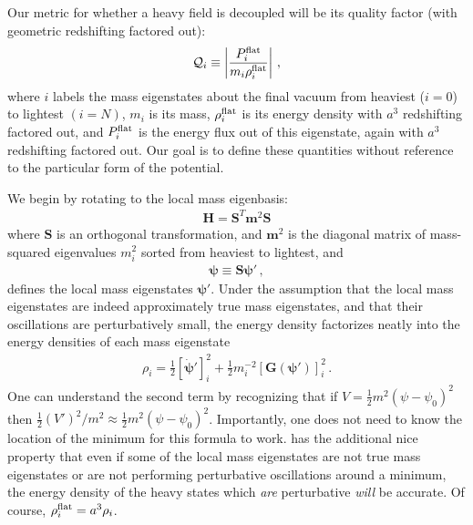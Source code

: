 \documentclass[11pt]{article}
\begin{document}
Our metric for whether a heavy field is decoupled will be its quality factor (with geometric redshifting factored out):
\begin{align}
    {\cal Q}_i\equiv \left|\frac{P_i^{\rm flat}}{m_i\rho_i^{\rm flat}}\right|\,,
\end{align}
where $i$ labels the mass eigenstates about the final vacuum from heaviest ($i = 0$) to lightest $(i = N)$, $m_i$ is its mass, $\rho_i^{\rm flat}$ is its energy density with $a^3$ redshifting factored out, and $P_i^{\rm flat}$ is the energy flux out of this eigenstate, again with $a^3$ redshifting factored out. Our goal is to define these quantities without reference to the particular form of the potential.

We begin by rotating to the local mass eigenbasis:
\begin{align}
    \bm H = \bm S^T \bm m^2 \bm S
\end{align}
where $\bm S$ is an orthogonal transformation, and $\bm m^2$ is the diagonal matrix of mass-squared eigenvalues $m_i^2$ sorted from heaviest to lightest, and 
\begin{align}
    \bm\psi\equiv \bm S{\bm\psi}'\,,
\end{align}
defines the local mass eigenstates $\bm\psi'$.
Under the assumption that the local mass eigenstates are indeed approximately true mass eigenstates, and that their oscillations are perturbatively small, the energy density factorizes neatly into the energy densities of each mass eigenstate
\begin{align}\label{eqn:local_energy_density}
    \rho_i = \frac12 [\dot{\bm\psi}']_i^2 + \frac12m_i^{-2}[\bm G(\bm\psi')]_i^2\,.
\end{align}
One can understand the second term by recognizing that if $V = \frac12m^2(\psi - \psi_0)^2$ then $\frac12(V')^2/m^2\approx \frac12m^2(\psi-\psi_0)^2$. Importantly, one does not need to know the location of the minimum for this formula to work.  has the additional nice property that even if some of the local mass eigenstates are not true mass eigenstates or are not performing perturbative oscillations around a minimum, the energy density of the heavy states which \emph{are} perturbative \emph{will} be accurate. Of course, $\rho_i^{\rm flat} = a^3\rho_i$.
\end{document}

